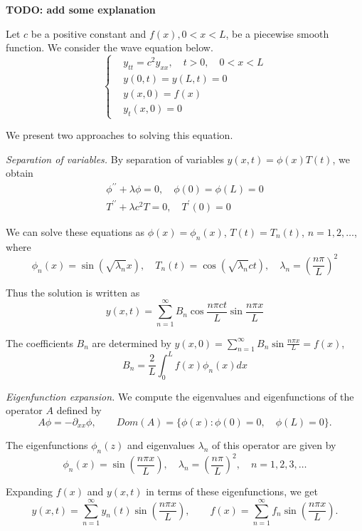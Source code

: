 \textbf{TODO: add some explanation}

Let $c$ be a positive constant and $f(x), 0<x<L$, be a piecewise smooth function. We consider the wave equation below.
\begin{equation}\label{eq.wave}
    \left\{
    \begin{aligned}
        &y_{t t}=c^2 y_{x x}, \quad t>0, \quad 0<x<L 
        \\
        &y(0, t)=y(L, t)=0 
        \\
        &y(x, 0)=f(x) 
        \\
        &y_t(x, 0)=0
    \end{aligned}
    \right.
\end{equation}

We present two approaches to solving this equation.

\textit{Separation of variables.} By separation of variables $y(x, t)=\phi(x) T(t)$, we obtain
$$
\begin{gathered}
    \phi^{\prime \prime}+\lambda \phi=0, \quad \phi(0)=\phi(L)=0
    \\
    T^{\prime \prime}+\lambda c^2 T=0, \quad T^{\prime}(0)=0
\end{gathered}
$$

We can solve these equations as $\phi(x)=\phi_n(x)$, $T(t)=T_n(t)$, $n=1,2, \ldots$, where
$$
\phi_n(x)=\sin \left(\sqrt{\lambda_n} x\right), \quad T_n(t)=\cos \left(\sqrt{\lambda_n} c t\right), \quad \lambda_n=\left(\frac{n \pi}{L}\right)^2
$$

Thus the solution is written as
$$
y(x, t)=\sum_{n=1}^{\infty} B_n \cos \frac{n \pi c t}{L} \sin \frac{n \pi x}{L}
$$

The coefficients $B_n$ are determined by $y(x, 0)=\sum_{n=1}^{\infty} B_n \sin \frac{n \pi x}{L}=f(x)$,
$$
B_n=\frac{2}{L} \int_0^L f(x) \phi_n(x) d x
$$

\textit{Eigenfunction expansion.} We compute the eigenvalues and eigenfunctions of the operator $A$ defined by
\[
    A \phi = -\partial_{xx} \phi,\qquad \textit{Dom}(A) = \{\phi(x): \phi(0) = 0, \quad \phi(L) = 0\}.
\]

The eigenfunctions $\phi_n(z)$ and eigenvalues $\lambda_n$ of this operator are given by
\[
    \phi_n(x) = \sin\left( \frac{n \pi x}{L} \right), \quad \lambda_n = \left( \frac{n \pi}{L} \right)^2, \quad n = 1, 2, 3, \dots
\]

Expanding $f(x)$ and $y(x, t)$ in terms of these eigenfunctions, we get
\begin{equation}\label{eq.wave_eigenfunction_expansion}
    y(x, t) = \sum_{n=1}^\infty y_n(t) \sin\left( \frac{n \pi x}{L} \right),\qquad f(x) = \sum_{n=1}^\infty f_n \sin\left( \frac{n \pi x}{L} \right).
\end{equation}


